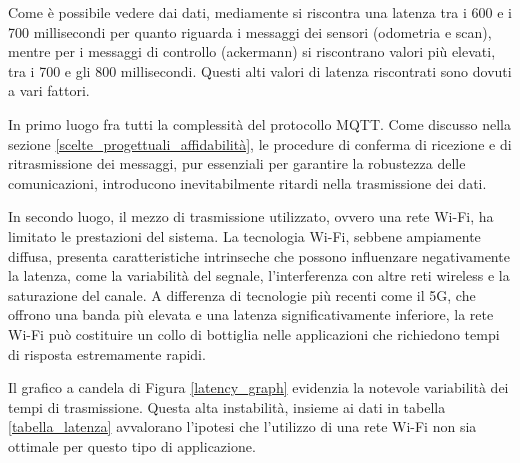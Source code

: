 \noindent Come è possibile vedere dai dati, mediamente si riscontra una latenza tra i 600 e i 700 millisecondi per quanto riguarda i messaggi dei sensori (odometria e scan), mentre per i messaggi di controllo (ackermann) si riscontrano valori più elevati, tra i 700 e gli 800 millisecondi. Questi alti valori di latenza riscontrati sono dovuti a vari fattori. 

\noindent In primo luogo fra tutti la complessità del protocollo MQTT. Come discusso nella sezione \ref{scelte_progettuali_affidabilità}, le procedure di conferma di ricezione e di ritrasmissione dei messaggi, pur essenziali per garantire la robustezza delle comunicazioni, introducono inevitabilmente ritardi nella trasmissione dei dati.

\noindent In secondo luogo, il mezzo di trasmissione utilizzato, ovvero una rete Wi-Fi, ha limitato le prestazioni del sistema. La tecnologia Wi-Fi, sebbene ampiamente diffusa, presenta caratteristiche intrinseche che possono influenzare negativamente la latenza, come la variabilità del segnale, l'interferenza con altre reti wireless e la saturazione del canale. A differenza di tecnologie più recenti come il 5G, che offrono una banda più elevata e una latenza significativamente inferiore, la rete Wi-Fi può costituire un collo di bottiglia nelle applicazioni che richiedono tempi di risposta estremamente rapidi.

\noindent Il grafico a candela di Figura \ref{latency_graph} evidenzia la notevole variabilità dei tempi di trasmissione. Questa alta instabilità, insieme ai dati in tabella \ref{tabella_latenza} avvalorano l'ipotesi che l'utilizzo di una rete Wi-Fi non sia ottimale per questo tipo di applicazione.

